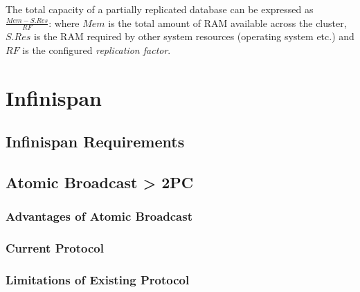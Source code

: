 	The total capacity of a partially replicated database can be expressed as $\frac{Mem - S.Res}{RF}$: where $Mem$ is the total amount of RAM available across the cluster, $S.Res$ is the RAM required by other system resources (operating system etc.) and $RF$ is the configured \emph{replication factor}.  


\section{Infinispan}\label{sec:infinispan}
	\subsection{Infinispan Requirements}
	\subsection{Atomic Broadcast > 2PC}
		\subsubsection{Advantages of Atomic Broadcast}
		\subsubsection{Current Protocol}
		\subsubsection{Limitations of Existing Protocol}

%
